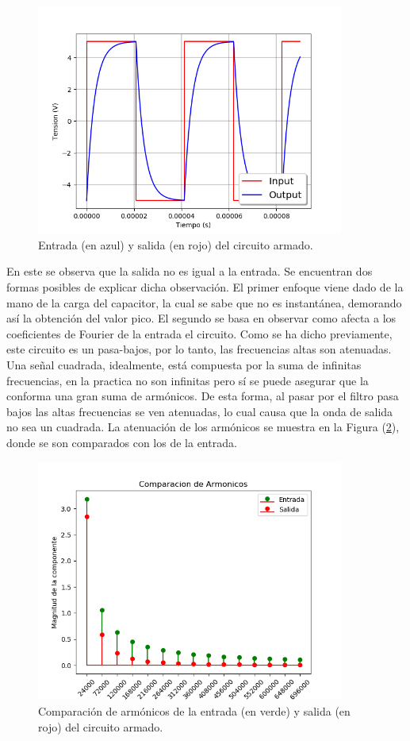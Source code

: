 \documentclass[a4paper]{article}
\begin{document}
\begin{figure}[H]
	\centering
	\includegraphics[width=0.9\textwidth]{Entrada-Salida.png}
\caption{Entrada (en azul) y salida (en rojo) del circuito armado.}
	\label{fig:simu2}
\end{figure}

En este se observa que la salida no es igual a la entrada. Se encuentran dos formas posibles de explicar dicha observación. El primer enfoque viene dado de la mano de la carga del capacitor, la cual se sabe que no es instantánea, demorando así la obtención del valor pico. El segundo se basa en observar como afecta a los coeficientes de Fourier de la entrada el circuito. Como se ha dicho previamente, este circuito es un pasa-bajos, por lo tanto, las frecuencias altas son atenuadas. Una señal cuadrada, idealmente, está compuesta por la suma de infinitas frecuencias, en la practica no son infinitas pero sí se puede asegurar que la conforma una gran suma de armónicos. De esta forma, al pasar por el filtro pasa bajos las altas frecuencias se ven atenuadas, lo cual  causa que la onda de salida no sea un cuadrada. La atenuación de los armónicos se muestra en la Figura (\ref{fig:armonicoscomparacion}), donde se son comparados con los de la entrada.

\begin{figure}[H]
	\centering
	\includegraphics[width=0.9\textwidth]{ComparacionDeArmionicos}
\caption{Comparación de armónicos de la entrada (en verde) y salida (en rojo) del circuito armado.}
	\label{fig:armonicoscomparacion}
\end{figure}
\end{document}
